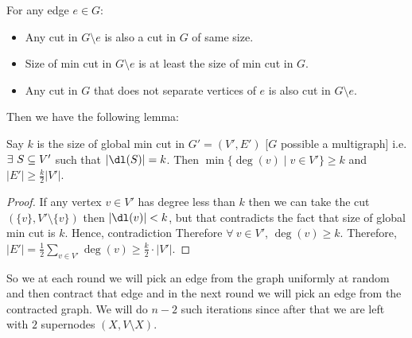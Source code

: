 \begin{observation*}For any edge $e\in G$:
	\begin{itemize}
		\item Any cut in $G\setminus e$ is also a cut in $G$ of same size.
		\item Size of min cut in $G\setminus e$ is at least the size of min cut in $G$.
		\item Any cut in $G$ that does not separate vertices of $e$ is also cut in $G\setminus e$.
	\end{itemize}
\end{observation*}

Then we have the following lemma:
\begin{lemma}{}{}
	Say $k$ is the size of global min cut in $G'=(V',E')$ [$G$ possible a multigraph] i.e. $\exists\ S\subseteq V'$ such that $|\dl(S)|=k$. Then $\min \{\deg(v)\mid v\in V'\}\geq k$ and $|E'|\geq \frac{k}{2}|V'|$.
\end{lemma}
\begin{proof}
	If any vertex $v\in V'$ has degree less than $k$ then we can take the cut $(\{v\}, V'\setminus\{v\})$ then $|\dl(v)|<k$, but that contradicts the fact that size of global min cut is $k$. Hence, contradiction \ctr Therefore $\forall\ v\in V'$, $\deg(v)\geq k$. Therefore, $|E'|=\frac12\sum\limits_{v\in V'}\deg(v)\geq \frac{k}2\cdot |V'|$.
\end{proof}

So we at each round we will pick an edge from the graph uniformly at random and then contract that edge and in the next round we will pick an edge from the contracted graph. We will do $n-2$ such iterations since after that we are left with $2$ supernodes $(X,V\setminus X)$.
\begin{algorithm}
	\caption{Karger's GMC Algorithm}
\end{algorithm}

